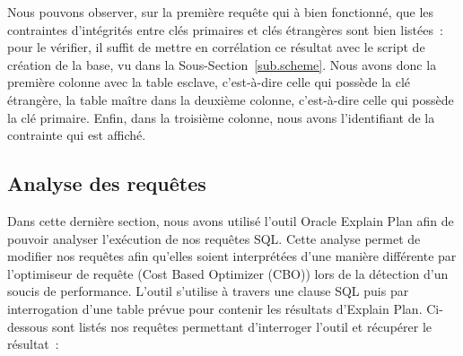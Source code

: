 \documentclass[12pt,a4paper]{article}
\begin{document}
Nous pouvons observer, sur la première requête qui à bien fonctionné, que les
contraintes d’intégrités entre clés primaires et clés étrangères sont bien
listées : pour le vérifier, il suffit de mettre en corrélation ce résultat avec
le script de création de la base, vu dans la Sous-Section~\ref{sub.scheme}. Nous
avons donc la première colonne avec la table esclave, c’est-à-dire celle qui
possède la clé étrangère, la table maître dans la deuxième colonne, c’est-à-dire
celle qui possède la clé primaire. Enfin, dans la troisième colonne, nous avons
l’identifiant de la contrainte qui est affiché.

\subsection{Analyse des requêtes}
\label{sub.analyze}

Dans cette dernière section, nous avons utilisé l'outil Oracle Explain Plan afin
de pouvoir analyser l’exécution de nos requêtes SQL. Cette analyse permet de
modifier nos requêtes afin qu’elles soient interprétées d’une manière différente
par l’optimiseur de requête (Cost Based Optimizer (CBO)) lors de la détection
d’un soucis de performance. L’outil s’utilise à travers une clause SQL puis par
interrogation d’une table prévue pour contenir les résultats d’Explain Plan.
Ci-dessous sont listés nos requêtes permettant d’interroger l’outil et récupérer
le résultat :
\end{document}
